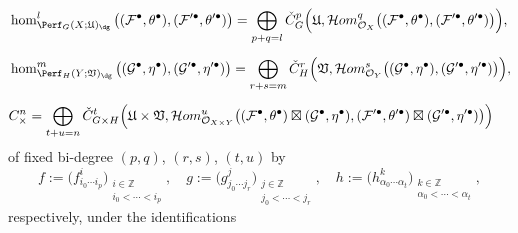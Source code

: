 \begin{align*}
\begin{split}
&
\hom_{\Perf_{G}(X;\mathfrak{U})_{\dg}}^l
\big(
(\mathcal{F}^{\bullet},\theta^{\bullet}),
(\mathcal{F}'^{\bullet},\theta'^{\bullet})
\big)
=
\bigoplus_{p+q=l}
\check{C}_{G}^p
\Big(
\mathfrak{U},
\mathcal{H}om_{\mathcal{O}_X}^q
\big(
(\mathcal{F}^{\bullet},\theta^{\bullet}),
(\mathcal{F}'^{\bullet},\theta'^{\bullet})
\big)
\Big),
\\[2mm]
&
\hom_{\Perf_{H}(Y;\mathfrak{V})_{\dg}}^m
\big(
(\mathcal{G}^{\bullet},\eta^{\bullet}),
(\mathcal{G}'^{\bullet},\eta'^{\bullet})
\big)
=
\bigoplus_{r+s=m}
\check{C}_{H}^r
\Big(
\mathfrak{V},
\mathcal{H}om_{\mathcal{O}_Y}^s
\big(
(\mathcal{G}^{\bullet},\eta^{\bullet}),
(\mathcal{G}'^{\bullet},\eta'^{\bullet})
\big)
\Big),
\\[2mm]
&
C_{\times}^n
=
\bigoplus_{t+u=n}
\check{C}_{G\times H}^t
\Big(
\mathfrak{U}\times\mathfrak{V},
\mathcal{H}om_{\mathcal{O}_{X\times Y}}^u
\big(
(\mathcal{F}^{\bullet},\theta^{\bullet})
\boxtimes
(\mathcal{G}^{\bullet},\eta^{\bullet}),
(\mathcal{F}'^{\bullet},\theta'^{\bullet})
\boxtimes
(\mathcal{G}'^{\bullet},\eta'^{\bullet})
\big)
\Big)
\end{split}
\end{align*}
of fixed bi-degree $(p,q)$, $(r,s)$, $(t,u)$
by
$$
f:=
\Big(f_{i_0\cdots i_p}^i\Big)
_{\substack{
i\in\mathbb{Z}
\\
i_0<\cdots<i_p
}},
\quad
g:=
\Big(g_{j_0\cdots j_r}^j\Big)
_{\substack{
j\in\mathbb{Z}
\\
j_0<\cdots<j_r
}},
\quad
h:=
\Big(h_{\alpha_0\cdots \alpha_t}^k\Big)
_{\substack{
k\in\mathbb{Z}
\\
\alpha_0<\cdots<\alpha_t
}},
$$
respectively,
under the identifications
